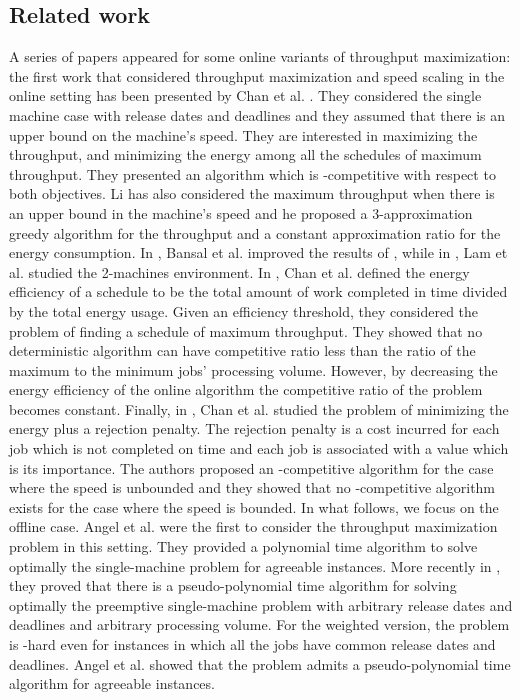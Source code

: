\documentclass[11pt,a4paper]{article}
\begin{document}
\subsection{Related work}
A series of papers appeared for some online variants of throughput maximization: the first work that considered throughput maximization and speed scaling in the online setting  has been presented by Chan et al.
\cite{CCLLMW07}. They considered the single machine case with release dates and deadlines and they assumed that there is an upper bound on the machine's speed.
They are interested in maximizing the throughput, and minimizing the energy among
all the schedules of maximum throughput.
They presented an algorithm which is -competitive with respect to both objectives.
Li \cite{Li11} has also considered the maximum throughput when
there is an upper bound in the machine's speed and he proposed
a 3-approximation greedy algorithm for the throughput and a 
constant approximation ratio for the energy consumption.
In \cite{BCLL08}, Bansal et al. improved the results of \cite{CCLLMW07}, while in \cite{LLTW07}, Lam et al. studied the 2-machines
environment.
In \cite{CLMW07}, Chan et al.  defined the energy efficiency of a schedule 
to be the total amount of work completed in time divided by the total energy usage.
Given an efficiency threshold, they considered the problem of finding a schedule of maximum throughput.
They showed that no deterministic algorithm can have competitive ratio less than the ratio of the maximum to 
the minimum jobs' processing volume.
However, by decreasing the energy efficiency of the online algorithm the competitive ratio
of the problem becomes constant.
 Finally,
in \cite{CLL10}, Chan et al. studied the problem of minimizing the energy plus a rejection penalty. The rejection penalty is a cost incurred for each job which is not completed on time and each job is associated with a value which is its importance. The authors proposed an -competitive algorithm for the case where the speed is unbounded and they showed that no -competitive algorithm exists for the case where the speed is bounded.
In what follows, we focus on the offline case.
Angel et al. \cite{ABCL13} were the first to consider the
throughput maximization problem in this setting. 
They provided
a polynomial time algorithm to solve optimally the single-machine problem for agreeable instances. More recently in \cite{ABC14}, they proved that there is a pseudo-polynomial time algorithm for solving optimally the preemptive single-machine problem with arbitrary release dates and deadlines and arbitrary processing volume. For the weighted version, the problem is -hard even for instances in which all the jobs have common release dates and deadlines. Angel et al. \cite{ABCL13} showed that the problem admits a pseudo-polynomial time algorithm for agreeable instances. 
\end{document}
